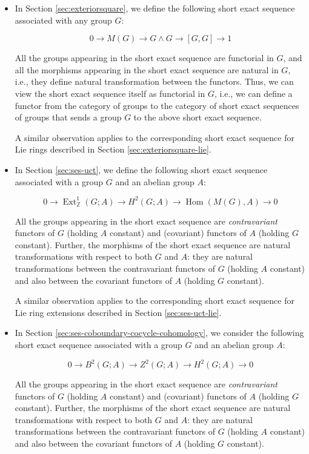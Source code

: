 \begin{itemize}
\item In Section \ref{sec:exteriorsquare}, we define the following
  short exact sequence associated with any group $G$:

  $$0 \to M(G) \to G \wedge G \to [G,G] \to 1$$

  All the groups appearing in the short exact sequence are functorial
  in $G$, and all the morphisms appearing in the short exact sequence
  are natural in $G$, i.e., they define natural transformation between
  the functors. Thus, we can view the short exact sequence itself as
  functorial in $G$, i.e., we can define a functor from the category
  of groups to the category of short exact sequences of groups that
  sends a group $G$ to the above short exact sequence.

  A similar observation applies to the corresponding short exact
  sequence for Lie rings described in Section
  \ref{sec:exteriorsquare-lie}.

\item In Section \ref{sec:ses-uct}, we define the following short
  exact sequence associated with a group $G$ and an abelian group $A$:

  $$0 \to \operatorname{Ext}^1_{\mathbb{Z}}(G;A) \to H^2(G;A) \to \operatorname{Hom}(M(G),A) \to 0$$

  All the groups appearing in the short exact sequence are {\em
    contravariant} functors of $G$ (holding $A$ constant) and
  (covariant) functors of $A$ (holding $G$ constant). Further, the
  morphisms of the short exact sequence are natural transformations
  with respect to both $G$ and $A$: they are natural transformations
  between the contravariant functors of $G$ (holding $A$ constant) and
  also between the covariant functors of $A$ (holding $G$ constant).

  A similar observation applies to the corresponding short exact
  sequence for Lie ring extensions described in Section
  \ref{sec:ses-uct-lie}.

\item In Section \ref{sec:ses-coboundary-cocycle-cohomology}, we
  consider the following short exact sequence associated with a group
  $G$ and an abelian group $A$:

  $$0 \to B^2(G;A) \to Z^2(G;A) \to H^2(G;A) \to 0$$

  All the groups appearing in the short exact sequence are {\em
    contravariant} functors of $G$ (holding $A$ constant) and
  (covariant) functors of $A$ (holding $G$ constant). Further, the
  morphisms of the short exact sequence are natural transformations
  with respect to both $G$ and $A$: they are natural transformations
  between the contravariant functors of $G$ (holding $A$ constant) and
  also between the covariant functors of $A$ (holding $G$ constant).

\end{itemize}

